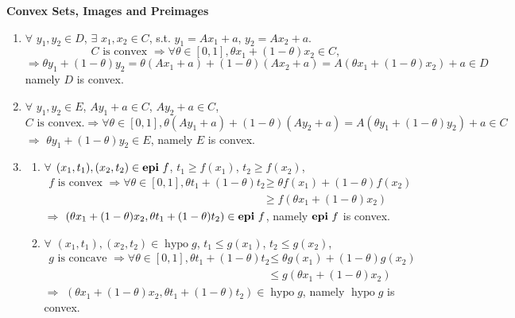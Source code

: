 \documentclass[11pt,letter,notitlepage]{article}
\DeclareMathOperator*{\epi}{\bf epi\,}
\theoremstyle{definition}
\begin{document}
    \begin{solution}\textbf{Convex Sets, Images and Preimages}
        \begin{enumerate}[label=(\arabic*)]
            \item 
            $\forall$ $y_1, y_2 \in D$, $\exists$ $x_1, x_2 \in C$, s.t. $y_1 = A x_1 + a$, $y_2 = A x_2 + a$.
            \[
            C \text{ is convex } \Longrightarrow \forall \theta \in [0,1], \theta x_1 + (1-\theta) x_2 \in C,
            \]
            \[
            \Longrightarrow
            \theta y_1 + (1-\theta) y_2
            =
            \theta (A x_1 + a) + (1-\theta)(A x_2 + a)
            =
            A(\theta x_1 + (1-\theta) x_2) + a
            \in D
            \]
            namely $D$ is convex.
            \item 
            $\forall$ $y_1, y_2 \in E$, $Ay_1 + a \in C$, $Ay_2 + a \in C$,
            \[
            C \text{ is convex.}
            \Longrightarrow
            \forall \theta \in [0,1],
            \theta (Ay_1 + a) + (1-\theta)(Ay_2 + a)
            =
            A(\theta y_1 + (1-\theta) y_2) + a
            \in C
            \]
            $\Longrightarrow$ $\theta y_1 + (1-\theta) y_2 \in E$, namely $E$ is convex.
            \item 
            \begin{enumerate}[label=(\alph*)]
                \item 
                $\forall$ $(x_1, t_1), (x_2, t_2) \in \epi f$, $t_1 \geq f(x_1)$, $t_2 \geq f(x_2)$,
                \begin{align}
                f \text{ is convex }
                \Longrightarrow
                \forall \theta \in [0,1],
                \theta t_1 + (1-\theta) t_2 
                &\geq \theta f(x_1) + (1-\theta) f(x_2)\nonumber\\
                &\geq f(\theta x_1 + (1-\theta) x_2)\nonumber
                \end{align}
                $\Longrightarrow$ $(\theta x_1 + (1-\theta) x_2, \theta t_1 + (1-\theta) t_2) \in \epi f$, namely $\epi f$ is convex.
                \item
                 $\forall$ $(x_1, t_1), (x_2, t_2) \in \operatorname{hypo} g$, $t_1 \leq g(x_1)$, $t_2 \leq g(x_2)$,
                \begin{align}
                g \text{ is concave }
                \Longrightarrow
                \forall \theta \in [0,1],
                \theta t_1 + (1-\theta) t_2 
                &\leq \theta g(x_1) + (1-\theta) g(x_2)\nonumber\\
                &\leq g(\theta x_1 + (1-\theta) x_2)\nonumber
                \end{align}
                $\Longrightarrow$ $(\theta x_1 + (1-\theta) x_2, \theta t_1 + (1-\theta) t_2) \in \operatorname{hypo} g$, namely $\operatorname{hypo} g$ is convex.


\end{enumerate}
\end{enumerate}
\end{solution}
\end{document}
